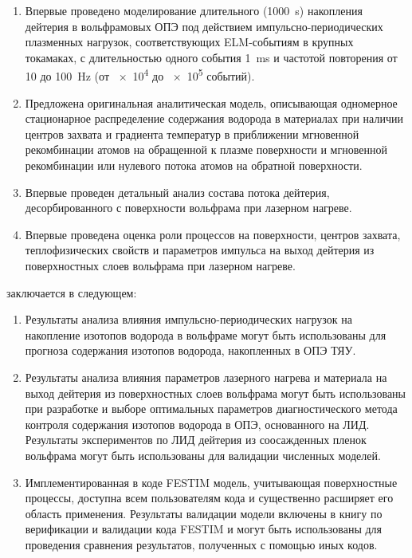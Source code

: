 {\novelty}
\begin{enumerate}[beginpenalty=10000] %
    \item Впервые проведено моделирование длительного (\SI{1000}{\second}) накопления дейтерия в вольфрамовых ОПЭ под действием импульсно-периодических плазменных нагрузок, соответствующих ELM-событиям в крупных токамаках, с длительностью одного события \SI{1}{\milli\second} и частотой повторения от \num{10} до \SI{100}{\hertz} (от \num{e4} до \num{e5} событий).
    \item Предложена оригинальная аналитическая модель, описывающая одномерное стационарное распределение содержания водорода в материалах при наличии центров захвата и градиента температур в приближении мгновенной рекомбинации атомов на обращенной к плазме поверхности и мгновенной рекомбинации или нулевого потока атомов на обратной поверхности.
    \item Впервые проведен детальный анализ состава потока дейтерия, десорбированного с поверхности вольфрама при лазерном нагреве.
    \item Впервые проведена оценка роли процессов на поверхности, центров захвата, теплофизических свойств и параметров импульса на выход дейтерия из поверхностных слоев вольфрама при лазерном нагреве.
\end{enumerate}

{\influence} заключается в следующем:
\begin{enumerate}[beginpenalty=10000] %
    \item Результаты анализа влияния импульсно-периодических нагрузок на накопление изотопов водорода в вольфраме могут быть использованы для прогноза содержания изотопов водорода, накопленных в ОПЭ ТЯУ.
    \item Результаты анализа влияния параметров лазерного нагрева и материала на выход дейтерия из поверхностных слоев вольфрама могут быть использованы при разработке и выборе оптимальных параметров диагностического метода контроля содержания изотопов водорода в ОПЭ, основанного на ЛИД. Результаты экспериментов по ЛИД дейтерия из соосажденных пленок вольфрама могут быть использованы для валидации численных моделей.
    \item Имплементированная в коде FESTIM модель, учитывающая поверхностные процессы, доступна всем пользователям кода и существенно расширяет его область применения. Результаты валидации модели включены в книгу по верификации и валидации кода FESTIM и могут быть использованы для проведения сравнения результатов, полученных с помощью иных кодов.
\end{enumerate}


